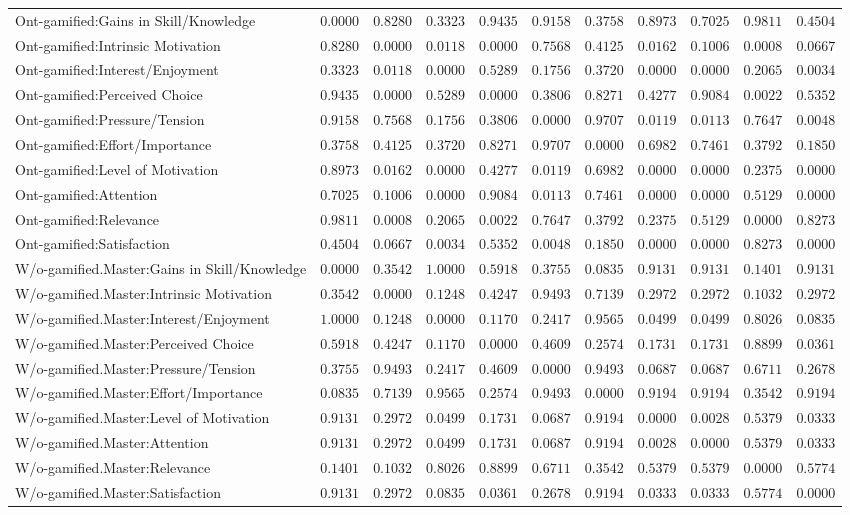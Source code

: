 \begin{landscape}
{\begin{longtable}{lrrrrrrrrrr}
Ont-gamified:Gains in Skill/Knowledge&$0.0000$&$0.8280$&$0.3323$&$0.9435$&$0.9158$&$0.3758$&$0.8973$&$0.7025$&$0.9811$&$0.4504$\tabularnewline
Ont-gamified:Intrinsic Motivation&$0.8280$&$0.0000$&$0.0118$&$0.0000$&$0.7568$&$0.4125$&$0.0162$&$0.1006$&$0.0008$&$0.0667$\tabularnewline
Ont-gamified:Interest/Enjoyment&$0.3323$&$0.0118$&$0.0000$&$0.5289$&$0.1756$&$0.3720$&$0.0000$&$0.0000$&$0.2065$&$0.0034$\tabularnewline
Ont-gamified:Perceived Choice&$0.9435$&$0.0000$&$0.5289$&$0.0000$&$0.3806$&$0.8271$&$0.4277$&$0.9084$&$0.0022$&$0.5352$\tabularnewline
Ont-gamified:Pressure/Tension&$0.9158$&$0.7568$&$0.1756$&$0.3806$&$0.0000$&$0.9707$&$0.0119$&$0.0113$&$0.7647$&$0.0048$\tabularnewline
Ont-gamified:Effort/Importance&$0.3758$&$0.4125$&$0.3720$&$0.8271$&$0.9707$&$0.0000$&$0.6982$&$0.7461$&$0.3792$&$0.1850$\tabularnewline
Ont-gamified:Level of Motivation&$0.8973$&$0.0162$&$0.0000$&$0.4277$&$0.0119$&$0.6982$&$0.0000$&$0.0000$&$0.2375$&$0.0000$\tabularnewline
Ont-gamified:Attention&$0.7025$&$0.1006$&$0.0000$&$0.9084$&$0.0113$&$0.7461$&$0.0000$&$0.0000$&$0.5129$&$0.0000$\tabularnewline
Ont-gamified:Relevance&$0.9811$&$0.0008$&$0.2065$&$0.0022$&$0.7647$&$0.3792$&$0.2375$&$0.5129$&$0.0000$&$0.8273$\tabularnewline
Ont-gamified:Satisfaction&$0.4504$&$0.0667$&$0.0034$&$0.5352$&$0.0048$&$0.1850$&$0.0000$&$0.0000$&$0.8273$&$0.0000$\tabularnewline
\hline


W/o-gamified.Master:Gains in Skill/Knowledge&$0.0000$&$0.3542$&$1.0000$&$0.5918$&$0.3755$&$0.0835$&$0.9131$&$0.9131$&$0.1401$&$0.9131$\tabularnewline
W/o-gamified.Master:Intrinsic Motivation&$0.3542$&$0.0000$&$0.1248$&$0.4247$&$0.9493$&$0.7139$&$0.2972$&$0.2972$&$0.1032$&$0.2972$\tabularnewline
W/o-gamified.Master:Interest/Enjoyment&$1.0000$&$0.1248$&$0.0000$&$0.1170$&$0.2417$&$0.9565$&$0.0499$&$0.0499$&$0.8026$&$0.0835$\tabularnewline
W/o-gamified.Master:Perceived Choice&$0.5918$&$0.4247$&$0.1170$&$0.0000$&$0.4609$&$0.2574$&$0.1731$&$0.1731$&$0.8899$&$0.0361$\tabularnewline
W/o-gamified.Master:Pressure/Tension&$0.3755$&$0.9493$&$0.2417$&$0.4609$&$0.0000$&$0.9493$&$0.0687$&$0.0687$&$0.6711$&$0.2678$\tabularnewline
W/o-gamified.Master:Effort/Importance&$0.0835$&$0.7139$&$0.9565$&$0.2574$&$0.9493$&$0.0000$&$0.9194$&$0.9194$&$0.3542$&$0.9194$\tabularnewline
W/o-gamified.Master:Level of Motivation&$0.9131$&$0.2972$&$0.0499$&$0.1731$&$0.0687$&$0.9194$&$0.0000$&$0.0028$&$0.5379$&$0.0333$\tabularnewline
W/o-gamified.Master:Attention&$0.9131$&$0.2972$&$0.0499$&$0.1731$&$0.0687$&$0.9194$&$0.0028$&$0.0000$&$0.5379$&$0.0333$\tabularnewline
W/o-gamified.Master:Relevance&$0.1401$&$0.1032$&$0.8026$&$0.8899$&$0.6711$&$0.3542$&$0.5379$&$0.5379$&$0.0000$&$0.5774$\tabularnewline
W/o-gamified.Master:Satisfaction&$0.9131$&$0.2972$&$0.0835$&$0.0361$&$0.2678$&$0.9194$&$0.0333$&$0.0333$&$0.5774$&$0.0000$\tabularnewline
\hline


\end{longtable}}
\end{landscape}
